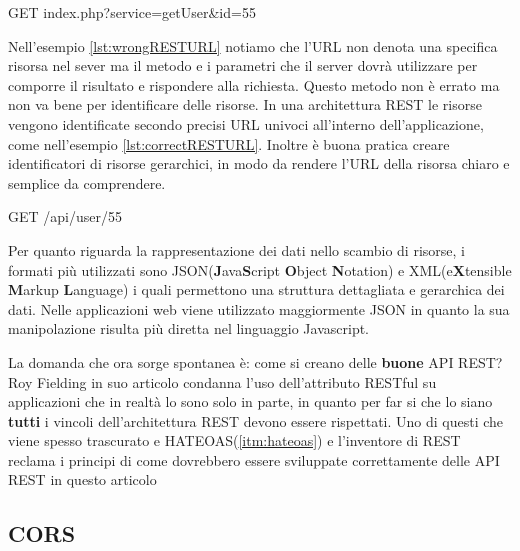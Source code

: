 \begin{code}[caption={Esempio di URL che non rispetta il vincolo di REST}, label={lst:wrongRESTURL}]
	GET index.php?service=getUser&id=55
\end{code}

Nell'esempio \ref{lst:wrongRESTURL} notiamo che l'URL non denota una specifica risorsa nel sever ma il metodo e i parametri che il server dovrà utilizzare per comporre il risultato e rispondere alla richiesta. Questo metodo non è errato ma non va bene per identificare delle risorse.
In una architettura REST le risorse vengono identificate secondo precisi URL univoci all'interno dell'applicazione, come nell'esempio \ref{lst:correctRESTURL}.
Inoltre è buona pratica creare identificatori di risorse gerarchici, in modo da rendere l'URL della risorsa chiaro e semplice da comprendere.

\begin{code}[caption={Identificazione di una risorsa all'interno di una architettura REST}, label={lst:correctRESTURL}]
	GET /api/user/55
\end{code}

Per quanto riguarda la rappresentazione dei dati nello scambio di risorse, i formati più utilizzati sono JSON(\textbf{J}ava\textbf{S}cript \textbf{O}bject \textbf{N}otation) e XML(e\textbf{X}tensible \textbf{M}arkup \textbf{L}anguage) i quali permettono una struttura dettagliata e gerarchica dei dati. Nelle applicazioni web viene utilizzato maggiormente JSON in quanto la sua manipolazione risulta più diretta nel linguaggio Javascript.

La domanda che ora sorge spontanea è: come si creano delle \textbf{buone} API REST? Roy Fielding in suo articolo condanna l'uso dell'attributo RESTful su applicazioni che in realtà lo sono solo in parte, in quanto per far si che lo siano \textbf{tutti} i vincoli dell'architettura REST devono essere rispettati.
Uno di questi che viene spesso trascurato e HATEOAS(\ref{itm:hateoas}) e l'inventore di REST reclama i principi di come dovrebbero essere sviluppate correttamente delle API REST in questo articolo \citep{web:restapi}


\subsection{CORS}


